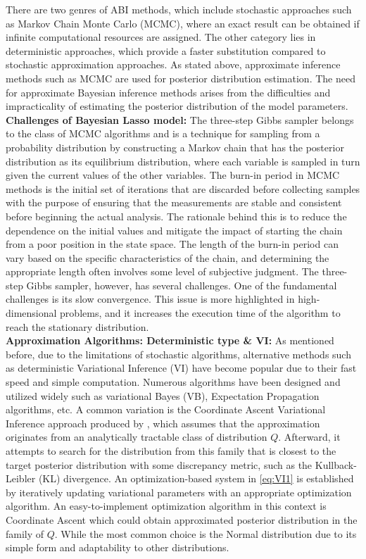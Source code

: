 There are two genres of ABI methods, which include stochastic approaches such as Markov Chain Monte Carlo (MCMC), where an exact result can be obtained if infinite computational resources are assigned. The other category lies in deterministic approaches, which provide a faster substitution compared to stochastic approximation approaches.
As stated above, approximate inference methods such as MCMC are used for posterior distribution estimation. The need for approximate Bayesian inference methods arises from the difficulties and impracticality of estimating the posterior distribution of the model parameters.\\
\noindent \textbf{Challenges of Bayesian Lasso model:}
The three-step Gibbs sampler belongs to the class of MCMC algorithms and is a technique for sampling from a probability distribution by constructing a Markov chain that has the posterior distribution as its equilibrium distribution,  where each variable is sampled in turn given the current values of the other variables. 
The burn-in period in MCMC methods is the initial set of iterations that are discarded before collecting samples with the purpose of ensuring that the measurements are stable and consistent before beginning the actual analysis. The rationale behind this is to reduce the dependence on the initial values and mitigate the impact of starting the chain from a poor position in the state space. The length of the burn-in period can vary based on the specific characteristics of the chain, and determining the appropriate length often involves some level of subjective judgment. 
The three-step Gibbs sampler, however, has several challenges. One of the fundamental challenges is its slow convergence. This issue is more highlighted in high-dimensional problems, and it increases the execution time of the algorithm to reach the stationary distribution.\\
\noindent \textbf{Approximation Algorithms: Deterministic type \& VI:}
As mentioned before, due to the limitations of stochastic algorithms, alternative methods such as deterministic Variational Inference (VI) have become popular due to their fast speed and simple computation.
Numerous algorithms have been designed and utilized widely such as variational Bayes (VB), Expectation Propagation algorithms, etc. A common variation is the Coordinate Ascent Variational Inference approach produced by \cite{Blei2003LDA}, which assumes that the approximation originates from an analytically tractable class of distribution $Q$. Afterward, it attempts to search for the distribution from this family that is closest to the target posterior distribution with some discrepancy metric, such as the Kullback-Leibler (KL) divergence. An optimization-based system in \autoref{eq:VI1} is established by iteratively updating variational parameters with an appropriate optimization algorithm. An easy-to-implement optimization algorithm in this context is Coordinate Ascent which could obtain approximated posterior distribution in the family of $Q$. While the most common choice is the Normal distribution due to its simple form and adaptability to other distributions.

